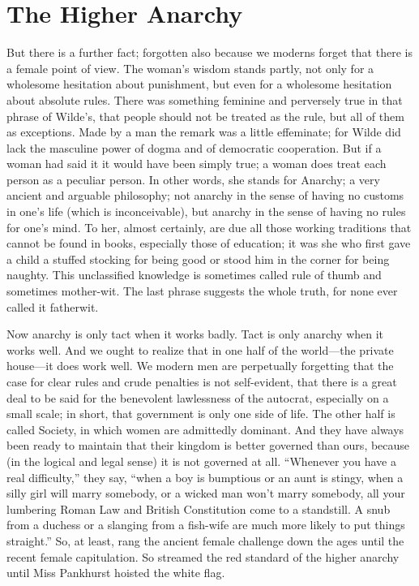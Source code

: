 \documentclass{book}
\begin{document}
\chapter{The Higher Anarchy}
\label{chapter-28}
But there is a further fact; forgotten also because we moderns forget that there is a female point of view. The woman’s wisdom stands partly, not only for a wholesome hesitation about punishment, but even for a wholesome hesitation about absolute rules. There was something feminine and perversely true in that phrase of Wilde’s, that people should not be treated as the rule, but all of them as exceptions. Made by a man the remark was a little effeminate; for Wilde did lack the masculine power of dogma and of democratic cooperation. But if a woman had said it it would have been simply true; a woman does treat each person as a peculiar person. In other words, she stands for Anarchy; a very ancient and arguable philosophy; not anarchy in the sense of having no customs in one’s life (which is inconceivable), but anarchy in the sense of having no rules for one’s mind. To her, almost certainly, are due all those working traditions that cannot be found in books, especially those of education; it was she who first gave a child a stuffed stocking for being good or stood him in the corner for being naughty. This unclassified knowledge is sometimes called rule of thumb and sometimes mother-wit. The last phrase suggests the whole truth, for none ever called it fatherwit.

Now anarchy is only tact when it works badly. Tact is only anarchy when it works well. And we ought to realize that in one half of the world—the private house—it does work well. We modern men are perpetually forgetting that the case for clear rules and crude penalties is not self-evident, that there is a great deal to be said for the benevolent lawlessness of the autocrat, especially on a small scale; in short, that government is only one side of life. The other half is called Society, in which women are admittedly dominant. And they have always been ready to maintain that their kingdom is better governed than ours, because (in the logical and legal sense) it is not governed at all. “Whenever you have a real difficulty,” they say, “when a boy is bumptious or an aunt is stingy, when a silly girl will marry somebody, or a wicked man won’t marry somebody, all your lumbering Roman Law and British Constitution come to a standstill. A snub from a duchess or a slanging from a fish-wife are much more likely to put things straight.” So, at least, rang the ancient female challenge down the ages until the recent female capitulation. So streamed the red standard of the higher anarchy until Miss Pankhurst hoisted the white flag.
\end{document}
